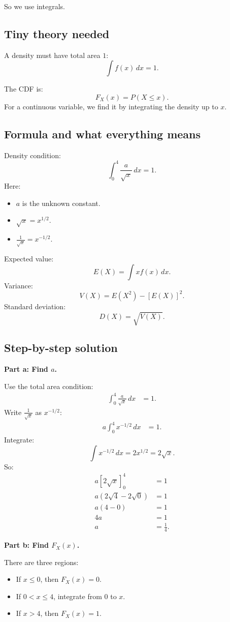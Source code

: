 \documentclass[11pt,a4paper]{article}
\begin{document}
So we use integrals.

\subsection*{Tiny theory needed}
A density must have total area \(1\):
\[
\int f(x)\,dx=1.
\]

The CDF is:
\[
F_X(x)=P(X\le x).
\]
For a continuous variable, we find it by integrating the density up to \(x\).

\subsection*{Formula and what everything means}
Density condition:
\[
\int_0^4 \frac{a}{\sqrt{x}}\,dx=1.
\]
Here:
\begin{itemize}[leftmargin=*]
    \item \(a\) is the unknown constant.
    \item \(\sqrt{x}=x^{1/2}\).
    \item \(\frac{1}{\sqrt{x}}=x^{-1/2}\).
\end{itemize}

Expected value:
\[
E(X)=\int x f(x)\,dx.
\]
Variance:
\[
V(X)=E(X^2)-[E(X)]^2.
\]
Standard deviation:
\[
D(X)=\sqrt{V(X)}.
\]

\subsection*{Step-by-step solution}
\textbf{Part a: Find \(a\).}

Use the total area condition:
\begin{align*}
\int_0^4 \frac{a}{\sqrt{x}}\,dx&=1.
\end{align*}
Write \(\frac{1}{\sqrt{x}}\) as \(x^{-1/2}\):
\begin{align*}
a\int_0^4 x^{-1/2}\,dx&=1.
\end{align*}
Integrate:
\[
\int x^{-1/2}\,dx=2x^{1/2}=2\sqrt{x}.
\]
So:
\begin{align*}
a[2\sqrt{x}]_0^4&=1\\
a(2\sqrt{4}-2\sqrt{0})&=1\\
a(4-0)&=1\\
4a&=1\\
a&=\frac{1}{4}.
\end{align*}

\textbf{Part b: Find \(F_X(x)\).}

There are three regions:
\begin{itemize}[leftmargin=*]
    \item If \(x\le 0\), then \(F_X(x)=0\).
    \item If \(0<x\le 4\), integrate from \(0\) to \(x\).
    \item If \(x>4\), then \(F_X(x)=1\).
\end{itemize}
\end{document}
